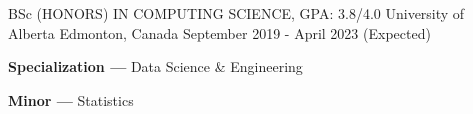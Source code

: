 
\begin{cventries}
  \cventry
    {BSc (HONORS) IN COMPUTING SCIENCE, GPA: 3.8/4.0} %
    {University of Alberta} %
    {Edmonton, Canada} %
    {September 2019 - April 2023 (Expected)} %
    {
      \begin{cvitems} %
         \item {\textbf{Specialization ---} Data Science \& Engineering}
         \vspace{0.5mm}
         \item {\textbf{Minor ---} Statistics }
      \end{cvitems}
    }
\end{cventries}
